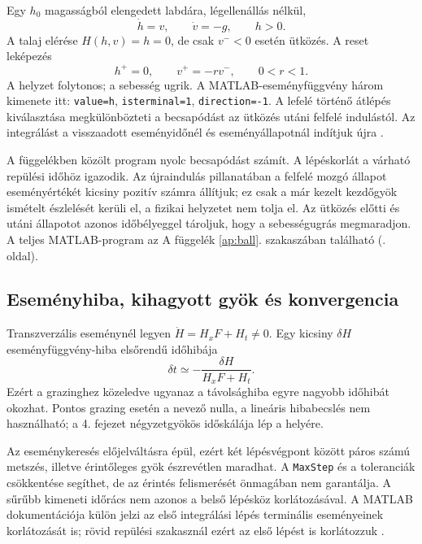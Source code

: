 Egy $h_0$ magasságból elengedett labdára, légellenállás nélkül,
\begin{equation}\label{eq:ball_flow}
\dot h=v,\qquad \dot v=-g,\qquad h>0.
\end{equation}
A talaj elérése $H(h,v)=h=0$, de csak $v^-<0$ esetén ütközés. A reset leképezés
\begin{equation}\label{eq:ball_reset}
h^+=0,\qquad v^+=-rv^-,\qquad 0<r<1.
\end{equation}
A helyzet folytonos; a sebesség ugrik. A MATLAB-eseményfüggvény három kimenete itt: \texttt{value=h}, \texttt{isterminal=1}, \texttt{direction=-1}. A lefelé történő átlépés kiválasztása megkülönbözteti a becsapódást az ütközés utáni felfelé indulástól. Az integrálást a visszaadott eseményidőnél és eseményállapotnál indítjuk újra \cite{matlab_events}.

A függelékben közölt program nyolc becsapódást számít. A lépéskorlát a várható repülési időhöz igazodik. Az újraindulás pillanatában a felfelé mozgó állapot eseményértékét kicsiny pozitív számra állítjuk; ez csak a már kezelt kezdőgyök ismételt észlelését kerüli el, a fizikai helyzetet nem tolja el. Az ütközés előtti és utáni állapotot azonos időbélyeggel tároljuk, hogy a sebességugrás megmaradjon.
\label{use:ball}A teljes MATLAB-program az A függelék \ref{ap:ball}. szakaszában található (\pageref{ap:ball}. oldal).
\exampleend

\subsection{Eseményhiba, kihagyott gyök és konvergencia}
Transzverzális eseménynél legyen $\dot H=H_xF+H_t\neq0$. Egy kicsiny $\delta H$ eseményfüggvény-hiba elsőrendű időhibája
\begin{equation}\label{eq:event_time_error}
\delta t\simeq-\frac{\delta H}{H_xF+H_t}.
\end{equation}
Ezért a grazinghez közeledve ugyanaz a távolsághiba egyre nagyobb időhibát okozhat. Pontos grazing esetén a nevező nulla, a lineáris hibabecslés nem használható; a 4. fejezet négyzetgyökös időskálája lép a helyére.

Az eseménykeresés előjelváltásra épül, ezért két lépésvégpont között páros számú metszés, illetve érintőleges gyök észrevétlen maradhat. A \texttt{MaxStep} és a toleranciák csökkentése segíthet, de az érintés felismerését önmagában nem garantálja. A sűrűbb kimeneti időrács nem azonos a belső lépésköz korlátozásával. A MATLAB dokumentációja külön jelzi az első integrálási lépés terminális eseményeinek korlátozását is; rövid repülési szakasznál ezért az első lépést is korlátozzuk \cite{matlab_events}.

